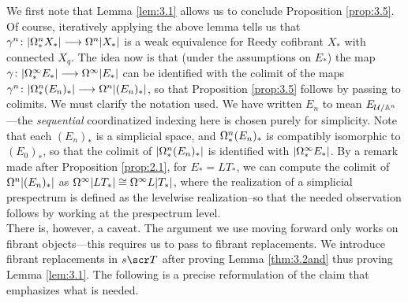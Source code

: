 \documentclass{amsart}
\theoremstyle{definition}
\begin{document}
We first note that Lemma \ref{lem:3.1} allows us to conclude Proposition \ref{prop:3.5}. Of course, iteratively applying the above lemma tells us that $\gamma^n \colon |\Omega^n_* X_*| \longrightarrow \Omega^n|X_*|$ is a weak equivalence for Reedy cofibrant $X_*$ with connected $X_q$. The idea now is that (under the assumptions on $E_*$) the map $\gamma \colon |\Omega^{\infty}_* E_*| \longrightarrow \Omega^{\infty}|E_*|$ can be identified with the colimit of the maps $\gamma^n \colon |\Omega^n_* (E_n)_*| \longrightarrow \Omega^n|(E_n)_*|$, so that Proposition \ref{prop:3.5} follows by passing to colimits. We must clarify the notation used. We have written $E_n$  to mean $E_{{\mathcal{U}}/\mathbb{A}^n}$---the \emph{sequential} coordinatized indexing here is chosen purely for simplicity. Note that each $(E_n)_*$ is a simplicial space, and $\Omega^n_* (E_n)_*$ is compatibly isomorphic to $(E_0)_*$, so that the colimit of $|\Omega^n_* (E_n)_*|$ is identified with $|\Omega^{\infty}_*E_*|$. By a remark made after Proposition \ref{prop:2.1}, for $E_* = LT_*$, we can compute the colimit of $\Omega^n |(E_n)_*|$ as $\Omega^{\infty} |L T_*| \cong \Omega^{\infty} L|T_*|$, where the realization of a simplicial prespectrum is defined as the levelwise realization--so that the needed observation follows by working at the prespectrum level.\\

There is, however, a caveat. The argument we use moving forward only works on fibrant objects---this requires us to pass to fibrant replacements. We introduce fibrant replacements in $s\sT$ after proving Lemma \ref{thm:3.2and} thus proving Lemma \ref{lem:3.1}. The following is a precise reformulation of the claim that emphasizes what is needed.
\end{document}
